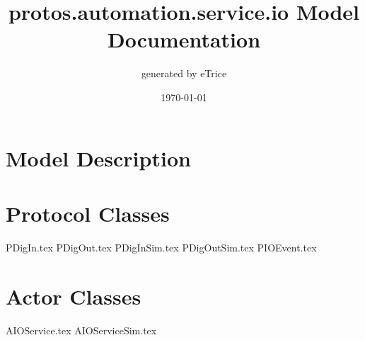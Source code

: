 \documentclass[titlepage]{article}
\title{protos.automation.service.io Model Documentation}
\date{\today}
\author{generated by eTrice}
\begin{document}
\pagestyle{plain}
\maketitle
\tableofcontents

\newpage
\listoffigures
\newpage
\section{Model Description}



\section{Protocol Classes}
{PDigIn.tex}
{PDigOut.tex}
{PDigInSim.tex}
{PDigOutSim.tex}
{PIOEvent.tex}
\newpage



\section{Actor Classes}
{AIOService.tex}
{AIOServiceSim.tex}
\end{document}
